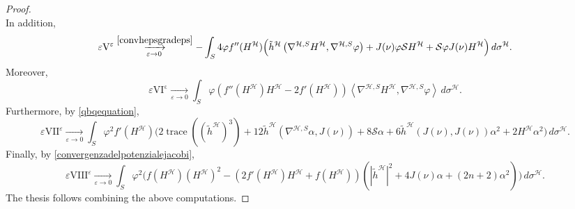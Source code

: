 \documentclass[11pt]{amsart}
\newcommand{\hhh}{{\mathcal{H}}}
\newcommand{\tmc}{{\mathscr{H}}}
\newcommand{\vh}{\nu}
\newcommand{\eps}{\varepsilon}
\newcommand{\s}{\mathcal S}
\newcommand{\Z}{\mathbf{Z}}
\DeclareMathOperator{\divv}{div}
\DeclareMathOperator{\trace}{trace}
\newcommand{\jacobi}{\mathcal{J}}
\theoremstyle{definition}
\theoremstyle{remark}
\numberwithin{equation}{section}
\begin{document}
\begin{proof}
\begin{equation*}
    \end{equation*}
    In addition,
    \begin{equation*}
       \eps \mathrm{V}^\eps   \overset{\eqref{convhepsgradeps}}{\xrightarrow[\eps\to 0]{}}-\int_S 4\varphi f''(H^\hhh)\Big(\tilde h^\hhh\left(\nabla^{\hhh,S}H^\hhh,\nabla^{\hhh,S}\varphi\right)+ J(\vh)\varphi\s H^\hhh+ \s \varphi J(\vh)H^\hhh\Big)\,d\sigma^\hhh.
    \end{equation*}
    Moreover, 
    \begin{equation*}
        \eps\mathrm{VI^\eps}\xrightarrow[\eps\to 0]{}\int_S\varphi\left(f''(H^\hhh)H^\hhh-2f'(H^\hhh)\right)\left\langle \nabla^{\hhh,S} H^\hhh,\nabla^{\hhh,S}\varphi\right\rangle\,d\sigma^\hhh.
    \end{equation*}
    Furthermore, by \eqref{qbqequation},
    \begin{equation*}
        \eps\mathrm{VII}^\eps\xrightarrow[\eps\to 0]{}\int_S\varphi^2 f'(H^\hhh)\Big( 2\trace\left(\left(\tilde h^\hhh\right)^3\right)+12\tilde h^\hhh\left(\nabla^{\hhh,S}\alpha,J(\vh)\right)+8\s\alpha+6\tilde h^\hhh(J(\vh),J(\vh))\alpha^2+2 H^\hhh\alpha^2\Big)\,d\sigma^\hhh.
    \end{equation*}
    Finally, by \eqref{convergenzadelpotenzialejacobi},
    \begin{equation*}
        \eps\mathrm{VIII}^\eps\xrightarrow[\eps\to 0]{}\int_S\varphi^2 \Big ( f(H^\hhh)\left( H^\hhh\right)^2-\left(2f'(H^\hhh) H^\hhh+f(H^\hhh)\right)\left(|\tilde h^\hhh|^2+4J(\vh)\alpha+(2n+2)\alpha^2\right)\Big)\,d\sigma^\hhh.
    \end{equation*}
  The thesis follows combining the above computations.

\end{proof}
\end{document}
